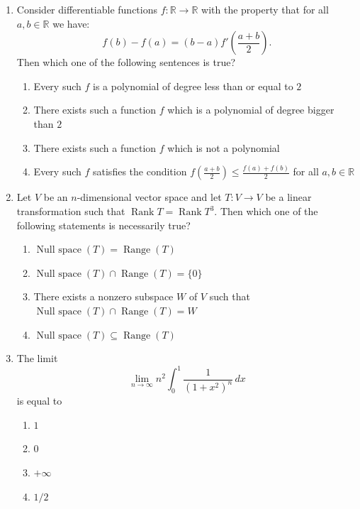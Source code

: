 \documentclass[11pt, a4paper]{article}
\begin{document}
\begin{enumerate}
  \item Consider differentiable functions $f: \mathbb{R} \to \mathbb{R}$ with the property that for all $a, b \in \mathbb{R}$ we have:
  \[
    f(b) - f(a) = (b - a) f'\left(\frac{a + b}{2}\right).
  \]
  Then which one of the following sentences is true?
  \begin{enumerate}[label=(\alph*)]
    \item Every such $f$ is a polynomial of degree less than or equal to $2$
    \item There exists such a function $f$ which is a polynomial of degree bigger than $2$
    \item There exists such a function $f$ which is not a polynomial
    \item Every such $f$ satisfies the condition $f\left(\frac{a+b}{2}\right) \le \frac{f(a) + f(b)}{2}$ for all $a, b \in \mathbb{R}$
  \end{enumerate}

  \item Let $V$ be an $n$-dimensional vector space and let $T: V \to V$ be a linear transformation such that $\operatorname{Rank} T = \operatorname{Rank} T^3$. Then which one of the following statements is necessarily true?
  \begin{enumerate}[label=(\alph*)]
    \item $\operatorname{Null~space}(T) = \operatorname{Range}(T)$
    \item $\operatorname{Null~space}(T) \cap \operatorname{Range}(T) = \{0\}$
    \item There exists a nonzero subspace $W$ of $V$ such that $\operatorname{Null~space}(T) \cap \operatorname{Range}(T) = W$
    \item $\operatorname{Null~space}(T) \subseteq \operatorname{Range}(T)$
  \end{enumerate}

  \item The limit
  \[
    \lim_{n \to \infty} n^2 \int_0^1 \frac{1}{(1 + x^2)^n}\,dx
  \]
  is equal to
  \begin{enumerate}[label=(\alph*)]
    \item $1$
    \item $0$
    \item $+\infty$
    \item $1/2$
  \end{enumerate}


\end{enumerate}
\end{document}
